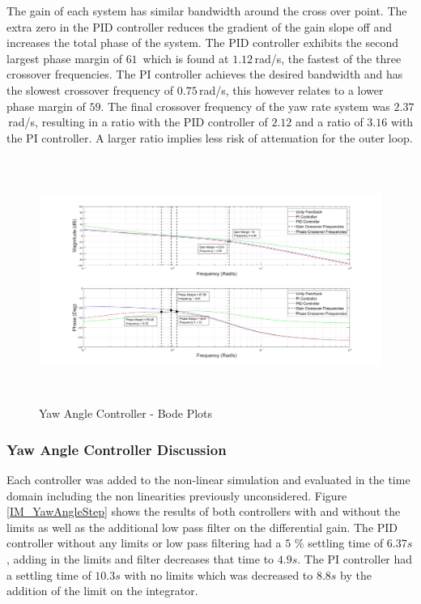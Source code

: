 	The gain of each system has similar bandwidth around the cross over point. The extra zero in the PID controller reduces the gradient of the gain slope off and increases the total phase of the system. The PID controller exhibits the second largest phase margin of $61$\textdegree\ which is found at $1.12$\,rad/s, the fastest of the three crossover frequencies. The PI controller achieves the desired bandwidth and has the slowest crossover frequency of $0.75$\,rad/s, this however relates to a lower phase margin of $59$\textdegree. The final crossover frequency of the yaw rate system was $2.37$\,rad/s, resulting in a ratio with the PID controller of $2.12$ and a ratio of $3.16$ with the PI controller. A larger ratio implies less risk of attenuation for the outer loop.
	
	\begin{figure}[H]
		\centering
		\includegraphics[height = 8cm]{../Design/Matlab/Controllers/yaw_angle_bode.jpg}
		\caption{Yaw Angle Controller -  Bode Plots}
		\label{IM_YawAngleControlBode}
	\end{figure}
	
	\subsubsection{Yaw Angle Controller Discussion}	
	Each controller was added to the non-linear simulation and evaluated in the time domain including the non linearities previously unconsidered. Figure \ref{IM_YawAngleStep} shows the results of both controllers with and without the limits as well as the additional low pass filter on the differential gain. The PID controller without any limits or low pass filtering had a $5$ \% settling time of $6.37s$, adding in the limits and filter decreases that time to $4.9s$. The PI controller had a settling time of $10.3s$ with no limits which was decreased to $8.8s$ by the addition of the limit on the integrator.
	
